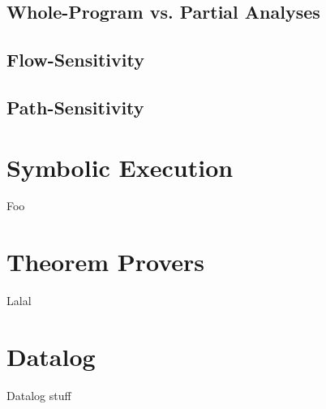 \subsection{Whole-Program vs. Partial Analyses}

\subsection{Flow-Sensitivity}

\subsection{Path-Sensitivity}


\section{Symbolic Execution}
Foo

\section{Theorem Provers}
Lalal

\section{Datalog}
Datalog stuff